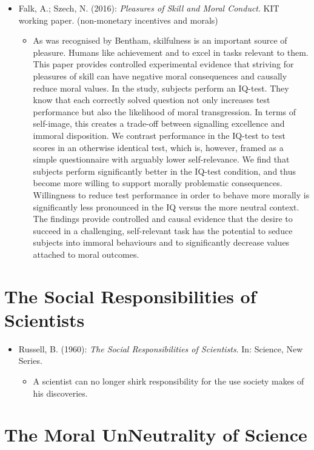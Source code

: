 \begin{itemize}
	\item Falk, A.; Szech, N. (2016): \textit{Pleasures of Skill and Moral Conduct}. KIT working paper. (non-monetary incentives and morals)
		\begin{itemize}
			\item As was recognised by Bentham, skilfulness is an important source of pleasure. Humans like achievement and to excel in tasks relevant to them. This paper provides controlled experimental evidence that striving for pleasures of skill can have negative moral consequences and causally reduce moral values. In the study, subjects perform an IQ-test. They know that each correctly solved question not only increases test performance but also the likelihood of moral transgression. In terms of self-image, this creates a trade-off between signalling excellence and immoral disposition. We contrast performance in the IQ-test to test scores in an otherwise identical test, which is, however, framed as a simple questionnaire with arguably lower self-relevance. We find that subjects perform significantly better in the IQ-test condition, and thus become more willing to support morally problematic consequences. Willingness to reduce test performance in order to behave more morally is significantly less pronounced in the IQ versus the more neutral context. The findings provide controlled and causal evidence that the desire to succeed in a challenging, self-relevant task has the potential to seduce subjects into immoral behaviours and to significantly decrease values attached to moral outcomes.
		\end{itemize}
\end{itemize}


\section{The Social Responsibilities of Scientists}

\begin{itemize}
	\item Russell, B. (1960): \textit{The Social Responsibilities of Scientists}. In: Science, New Series.
		\begin{itemize}
			\item A scientist can no longer shirk responsibility for the use society makes of his discoveries.
		\end{itemize}
\end{itemize}


\section{The Moral UnNeutrality of Science}

